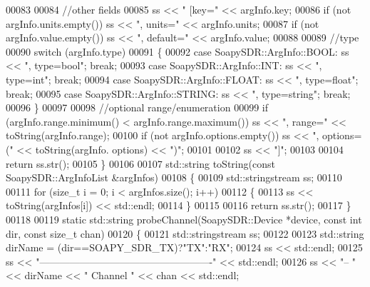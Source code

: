 \begin{DoxyCode}
00083 
00084     \textcolor{comment}{//other fields}
00085     ss << \textcolor{stringliteral}{" [key="} << argInfo.key;
00086     \textcolor{keywordflow}{if} (not argInfo.units.empty()) ss << \textcolor{stringliteral}{", units="} << argInfo.units;
00087     if (not argInfo.value.empty()) ss << \textcolor{stringliteral}{", default="} << argInfo.value;
00088 
00089     \textcolor{comment}{//type}
00090     switch (argInfo.type)
00091     \{
00092     \textcolor{keywordflow}{case} SoapySDR::ArgInfo::BOOL: ss << \textcolor{stringliteral}{", type=bool"}; \textcolor{keywordflow}{break};
00093     \textcolor{keywordflow}{case} SoapySDR::ArgInfo::INT: ss << \textcolor{stringliteral}{", type=int"}; \textcolor{keywordflow}{break};
00094     \textcolor{keywordflow}{case} SoapySDR::ArgInfo::FLOAT: ss << \textcolor{stringliteral}{", type=float"}; \textcolor{keywordflow}{break};
00095     \textcolor{keywordflow}{case} SoapySDR::ArgInfo::STRING: ss << \textcolor{stringliteral}{", type=string"}; \textcolor{keywordflow}{break};
00096     \}
00097 
00098     \textcolor{comment}{//optional range/enumeration}
00099     \textcolor{keywordflow}{if} (argInfo.range.minimum() < argInfo.range.maximum()) ss << \textcolor{stringliteral}{", range="} << 
      toString(argInfo.range);
00100     \textcolor{keywordflow}{if} (not argInfo.options.empty()) ss << \textcolor{stringliteral}{", options=("} << toString(argInfo.
      options) << \textcolor{stringliteral}{")"};
00101 
00102     ss << \textcolor{stringliteral}{"]"};
00103 
00104     \textcolor{keywordflow}{return} ss.str();
00105 \}
00106 
00107 std::string toString(\textcolor{keyword}{const} SoapySDR::ArgInfoList &argInfos)
00108 \{
00109     std::stringstream ss;
00110 
00111     \textcolor{keywordflow}{for} (\textcolor{keywordtype}{size\_t} i = 0; i < argInfos.size(); i++)
00112     \{
00113         ss << toString(argInfos[i]) << std::endl;
00114     \}
00115 
00116     \textcolor{keywordflow}{return} ss.str();
00117 \}
00118 
00119 \textcolor{keyword}{static} std::string probeChannel(SoapySDR::Device *device, \textcolor{keyword}{const} \textcolor{keywordtype}{int} dir, \textcolor{keyword}{const} \textcolor{keywordtype}{size\_t} 
      chan)
00120 \{
00121     std::stringstream ss;
00122 
00123     std::string dirName = (dir==SOAPY_SDR_TX)?\textcolor{stringliteral}{"TX"}:\textcolor{stringliteral}{"RX"};
00124     ss << std::endl;
00125     ss << \textcolor{stringliteral}{"----------------------------------------------------"} << std::endl;
00126     ss << \textcolor{stringliteral}{"-- "} << dirName << \textcolor{stringliteral}{" Channel "} << chan << std::endl;

\end{DoxyCode}
